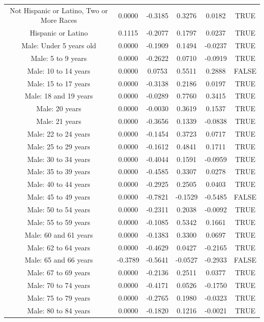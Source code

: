 \documentclass{article} %
\begin{document}
\begin{table}[H]
\begin{adjustbox}{width = \textwidth}
\begin{tabular}{cccccc}
  Not Hispanic or Latino, Two or More Races & 0.0000 & -0.3185 & 0.3276 & 0.0182 & TRUE \\ 
  Hispanic or Latino & 0.1115 & -0.2077 & 0.1797 & 0.0237 & TRUE \\ 
  Male: Under 5 years old & 0.0000 & -0.1909 & 0.1494 & -0.0237 & TRUE \\ 
  Male: 5 to 9 years & 0.0000 & -0.2622 & 0.0710 & -0.0919 & TRUE \\ 
  Male: 10 to 14 years & 0.0000 & 0.0753 & 0.5511 & 0.2888 & FALSE \\ 
  Male: 15 to 17 years & 0.0000 & -0.3138 & 0.2186 & 0.0197 & TRUE \\ 
  Male: 18 and 19 years & 0.0000 & -0.0289 & 0.7760 & 0.3415 & TRUE \\ 
  Male: 20 years & 0.0000 & -0.0030 & 0.3619 & 0.1537 & TRUE \\ 
  Male: 21 years & 0.0000 & -0.3656 & 0.1339 & -0.0838 & TRUE \\ 
  Male: 22 to 24 years & 0.0000 & -0.1454 & 0.3723 & 0.0717 & TRUE \\ 
  Male: 25 to 29 years & 0.0000 & -0.1612 & 0.4841 & 0.1711 & TRUE \\ 
  Male: 30 to 34 years & 0.0000 & -0.4044 & 0.1591 & -0.0959 & TRUE \\ 
  Male: 35 to 39 years & 0.0000 & -0.4585 & 0.3307 & 0.0278 & TRUE \\ 
  Male: 40 to 44 years & 0.0000 & -0.2925 & 0.2505 & 0.0403 & TRUE \\ 
  Male: 45 to 49 years & 0.0000 & -0.7821 & -0.1529 & -0.5485 & FALSE \\ 
  Male: 50 to 54 years & 0.0000 & -0.2311 & 0.2038 & -0.0092 & TRUE \\ 
  Male: 55 to 59 years & 0.0000 & -0.1085 & 0.5342 & 0.1661 & TRUE \\ 
  Male: 60 and 61 years & 0.0000 & -0.1383 & 0.3300 & 0.0697 & TRUE \\ 
  Male: 62 to 64 years & 0.0000 & -0.4629 & 0.0427 & -0.2165 & TRUE \\ 
  Male: 65 and 66 years & -0.3789 & -0.5641 & -0.0527 & -0.2933 & FALSE \\ 
  Male: 67 to 69 years & 0.0000 & -0.2136 & 0.2511 & 0.0377 & TRUE \\ 
  Male: 70 to 74 years & 0.0000 & -0.4171 & 0.0526 & -0.1750 & TRUE \\ 
  Male: 75 to 79 years & 0.0000 & -0.2765 & 0.1980 & -0.0323 & TRUE \\ 
  Male: 80 to 84 years & 0.0000 & -0.1820 & 0.1216 & -0.0021 & TRUE \\ 

\end{tabular}
\end{adjustbox}
\end{table}
\end{document}
